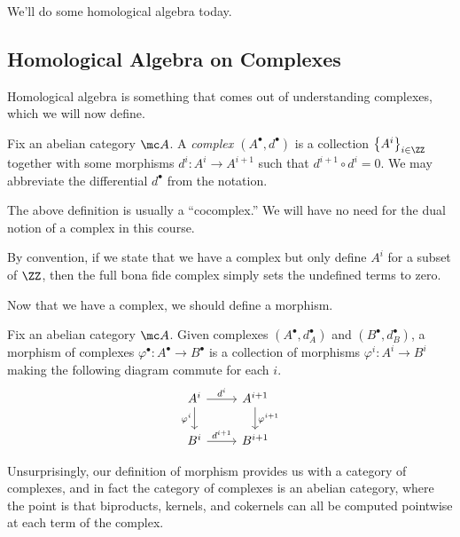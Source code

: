 \documentclass[../notes.tex]{subfiles}
\begin{document}
We'll do some homological algebra today.

\subsection{Homological Algebra on Complexes}
Homological algebra is something that comes out of understanding complexes, which we will now define.
\begin{definition}[complex]
	Fix an abelian category $\mc A$. A \textit{complex $(A^\bullet,d^\bullet)$} is a collection $\left\{A^i\right\}_{i\in\ZZ}$ together with some morphisms $d^i\colon A^i\to A^{i+1}$ such that $d^{i+1}\circ d^i=0$. We may abbreviate the differential $d^\bullet$ from the notation.
\end{definition}
\begin{remark}
	The above definition is usually a ``cocomplex.'' We will have no need for the dual notion of a complex in this course.
\end{remark}
\begin{remark}
	By convention, if we state that we have a complex but only define $A^i$ for a subset of $\ZZ$, then the full bona fide complex simply sets the undefined terms to zero.
\end{remark}
Now that we have a complex, we should define a morphism.
\begin{definition}
	Fix an abelian category $\mc A$. Given complexes $(A^\bullet,d_A^\bullet)$ and $(B^\bullet,d_B^\bullet)$, a morphism of complexes $\varphi^\bullet\colon A^\bullet\to B^\bullet$ is a collection of morphisms $\varphi^i\colon A^i\to B^i$ making the following diagram commute for each $i$.
	\[\begin{tikzcd}
		{A^i} & {A^{i+1}} \\
		{B^i} & {B^{i+1}}
		\arrow["{\varphi^i}"', from=1-1, to=2-1]
		\arrow["{\varphi^{i+1}}", from=1-2, to=2-2]
		\arrow["{d^i}", from=1-1, to=1-2]
		\arrow["{d^{i+1}}", from=2-1, to=2-2]
	\end{tikzcd}\]
\end{definition}
Unsurprisingly, our definition of morphism provides us with a category of complexes, and in fact the category of complexes is an abelian category, where the point is that biproducts, kernels, and cokernels can all be computed pointwise at each term of the complex.
\end{document}
